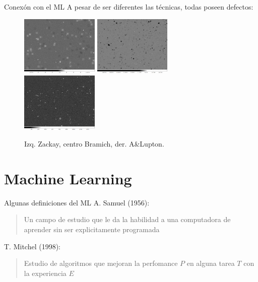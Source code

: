 \documentclass[11pt]{beamer}
\begin{document}
\begin{frame}{Conex\'on con el ML}
    A pesar de ser diferentes las t\'ecnicas, 
    todas poseen defectos:
    \begin{figure}
        \centering
        \includegraphics[width=0.33\textwidth]{images/diff.png}
        \includegraphics[width=0.33\textwidth]{images/diff_ois.png}
        \includegraphics[width=0.33\textwidth]{images/diff_hot.png}
        \caption{Izq. Zackay, centro Bramich, der. A\&Lupton.}
        \label{fig:restas}
    \end{figure}
    \end{frame}




\section{Machine Learning}

\begin{frame}{Algunas definiciones del ML}
    A. Samuel (1956):
    \begin{quote}
        Un campo de estudio que le da la habilidad a una computadora de aprender sin ser explicitamente programada
    \end{quote}
    T. Mitchel (1998):
    \begin{quote}
        Estudio de algoritmos que mejoran la perfomance $P$ en alguna tarea $T$ con la experiencia $E$
    \end{quote}
\end{frame}
\end{document}
